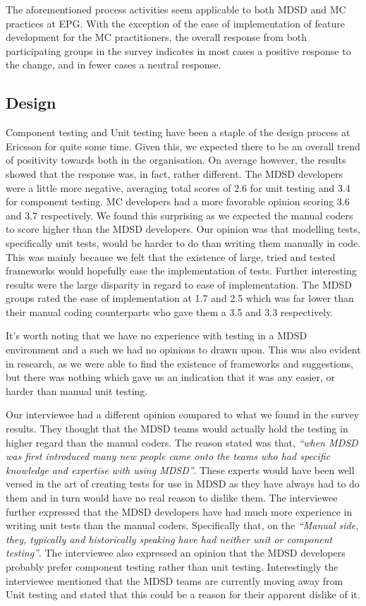 \documentclass[final_report_innit.tex]{subfiles}
\begin{document}
The aforementioned process activities seem applicable to both MDSD and MC practices at EPG. With the exception of the ease of implementation of feature development for the MC practitioners, the overall response from both participating groups in the survey indicates in most cases a positive response to the change, and in fewer cases a neutral response.

\subsection*{Design}

Component testing and Unit testing have been a staple of the design process at Ericsson for quite some time. Given this, we expected there to be an overall trend of positivity towards both in the organisation. On average however, the results showed that the response was, in fact, rather different. The MDSD developers were a little more negative, averaging total scores of 2.6 for unit testing and 3.4 for component testing. MC developers had a more favorable opinion scoring 3.6 and 3.7 respectively. We found this surprising as we expected the manual coders to score higher than the MDSD developers. Our opinion was that modelling tests, specifically unit tests, would be harder to do than writing them manually in code. This was mainly because we felt that the existence of large, tried and tested frameworks would hopefully ease the implementation of tests. Further interesting results were the large disparity in regard to ease of implementation. The MDSD groups rated the ease of implementation at 1.7 and 2.5 which was far lower than their manual coding counterparts who gave them a 3.5 and 3.3 respectively.

It's worth noting that we have no experience with testing in a MDSD environment and a such we had no opinions to drawn upon. This was also evident in research, as we were able to find the existence of frameworks and suggestions, but there was nothing which gave us an indication that it was any easier, or harder than manual unit testing.

Our interviewee had a different opinion compared to what we found in the survey results. They thought that the MDSD teams would actually hold the testing in higher regard than the manual coders. The reason stated was that, \textit{``when MDSD was first introduced many new people came onto the teams who had specific knowledge and expertise with using MDSD''}. These experts would have been well versed in the art of creating tests for use in MDSD as they have always had to do them and in turn would have no real reason to dislike them. The interviewee further expressed that the MDSD developers have had much more experience in writing unit tests than the manual coders. Specifically that, on the \textit{``Manual side, they, typically and historically speaking have had neither unit or component testing''}.
The interviewee also expressed an opinion that the MDSD developers probably prefer component testing rather than unit testing. Interestingly the interviewee mentioned that the MDSD teams are currently moving away from Unit testing and stated that this could be a reason for their apparent dislike of it.
\end{document}
